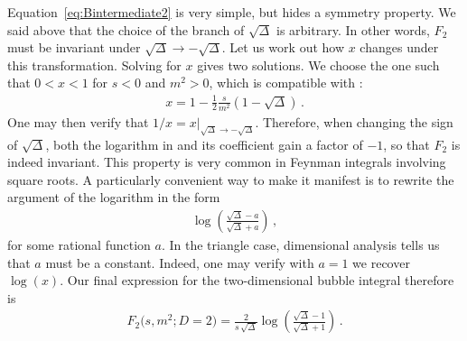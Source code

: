 Equation~\eqref{eq:Bintermediate2} is very simple, but hides a symmetry property. We said above that the choice of the branch of $\sqrt{\Delta}$ is arbitrary. In other words, $F_2$ must be invariant under $\sqrt{\Delta} \to - \sqrt{\Delta}$. Let us work out how $x$ changes under this transformation. Solving  for $x$ gives two solutions. We choose the one such that $0<x<1$ for $s<0$ and $m^2>0$, which is compatible with :
\begin{align}
x = 1 - \frac{1}{2} \frac{s}{m^2} \left(1-\sqrt{\Delta}\right) \,.
\end{align}
One may then verify that $1/x = x \bigl|_{\sqrt{\Delta} \to - \sqrt{\Delta}} $.
Therefore, when changing the sign of $\sqrt{\Delta}$, both the logarithm in  and its coefficient gain a factor of $-1$, so that $F_2$ is indeed invariant. This property is very common in Feynman integrals involving square roots. A particularly convenient way to make it manifest is to rewrite the argument of the logarithm in the form 
\begin{align}
\log\left( \frac{\sqrt{\Delta}-a}{\sqrt{\Delta}+a} \right) \,,
\end{align}
for some rational function $a$. In the triangle case, dimensional analysis tells us that $a$ must be a constant. Indeed, one may verify with $a=1$ we recover $\log(x)$. 
Our final expression for the two-dimensional bubble integral therefore is
\begin{align}
F_2\bigl(s,m^2; D=2\bigr) =  \frac{2}{s \, \sqrt{\Delta}} \log \left(  \frac{\sqrt{\Delta}-1}{\sqrt{\Delta}+1} \right) \,.
\end{align}



